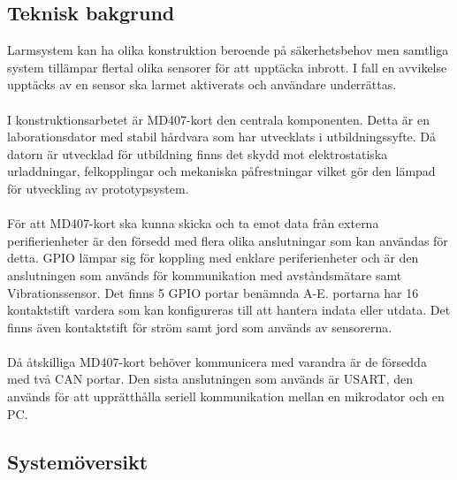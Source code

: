 \documentclass{article}
\begin{document}
\subsection{Teknisk bakgrund}
Larmsystem kan ha olika konstruktion beroende på säkerhetsbehov men samtliga system tillämpar flertal olika sensorer för att upptäcka inbrott. 
I fall en avvikelse upptäcks av en sensor ska larmet aktiverats och användare underrättas.
\\
\\
I konstruktionsarbetet är MD407-kort den centrala komponenten. 
Detta är en laborationsdator med stabil hårdvara som har utvecklats i utbildningssyfte. 
Då datorn är utvecklad för utbildning finns det skydd mot elektrostatiska urladdningar, felkopplingar och mekaniska påfrestningar vilket gör den lämpad för utveckling av prototypsystem.
\\
\\
För att MD407-kort ska kunna skicka och ta emot data från externa perifierienheter är den försedd med flera olika anslutningar som kan användas för detta. 
GPIO lämpar sig för koppling med enklare periferienheter och är den anslutningen som används för kommunikation med avståndsmätare samt Vibrationssensor. 
Det finns 5 GPIO portar benämnda A-E. portarna har 16 kontaktstift vardera som kan konfigureras till att hantera indata eller utdata. 
Det finns även kontaktstift för ström samt jord som används av sensorerna.
\\
\\
Då åtskilliga MD407-kort behöver kommunicera med varandra är de försedda med två CAN portar. Den sista anslutningen som används är USART, den används för att upprätthålla seriell kommunikation mellan en mikrodator och en PC.

\newpage
\subsection{Systemöversikt}
\end{document}
